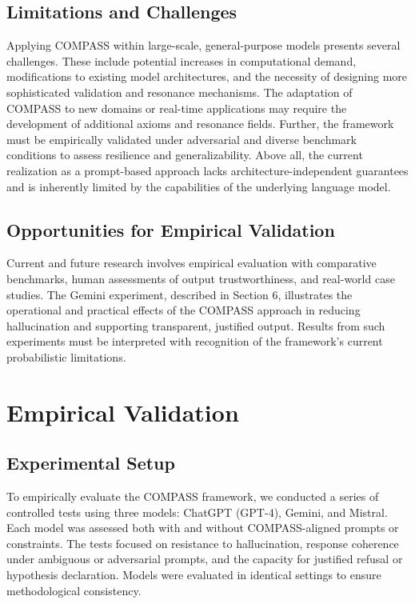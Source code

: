 \documentclass[11pt,a4paper]{article}
\begin{document}
\subsection{Limitations and Challenges}

Applying COMPASS within large-scale, general-purpose models presents several challenges. These include potential increases in computational demand, modifications to existing model architectures, and the necessity of designing more sophisticated validation and resonance mechanisms. The adaptation of COMPASS to new domains or real-time applications may require the development of additional axioms and resonance fields. Further, the framework must be empirically validated under adversarial and diverse benchmark conditions to assess resilience and generalizability. Above all, the current realization as a prompt-based approach lacks architecture-independent guarantees and is inherently limited by the capabilities of the underlying language model.

\subsection{Opportunities for Empirical Validation}

Current and future research involves empirical evaluation with comparative benchmarks, human assessments of output trustworthiness, and real-world case studies. The Gemini experiment, described in Section 6, illustrates the operational and practical effects of the COMPASS approach in reducing hallucination and supporting transparent, justified output. Results from such experiments must be interpreted with recognition of the framework’s current probabilistic limitations.

\section{Empirical Validation}

\subsection{Experimental Setup}

To empirically evaluate the COMPASS framework, we conducted a series of controlled tests using three models: ChatGPT (GPT-4), Gemini, and Mistral. Each model was assessed both with and without COMPASS-aligned prompts or constraints. The tests focused on resistance to hallucination, response coherence under ambiguous or adversarial prompts, and the capacity for justified refusal or hypothesis declaration. Models were evaluated in identical settings to ensure methodological consistency.
\end{document}

